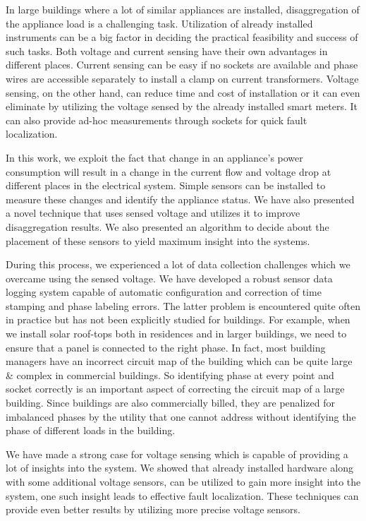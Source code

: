In large buildings where a lot of similar appliances are installed, disaggregation of the appliance load is a challenging task. Utilization of already installed instruments can be a big factor in deciding the practical feasibility and success of such tasks.
Both voltage and current sensing have their own advantages in different places. Current sensing can be easy if no sockets are available and phase wires are accessible separately to install a clamp on current transformers. Voltage sensing, on the other hand, can reduce time and cost of installation or it can even eliminate by utilizing the voltage sensed by the already installed smart meters. It can also provide ad-hoc measurements through sockets for quick fault localization.

In this work, we exploit the fact that change in an appliance's power consumption will result in a change in the current flow and voltage drop at different places in the electrical system. Simple sensors can be installed to measure these changes and identify the appliance status. We have also presented a novel technique that uses sensed voltage and utilizes it to improve disaggregation results. We also presented an algorithm to decide about the placement of these sensors to yield maximum insight into the systems.

During this process, we experienced a lot of data collection challenges which we overcame using the sensed voltage. We have developed a robust sensor data logging system capable of automatic configuration and correction of time stamping and phase labeling errors.  The latter problem is encountered quite often in practice but has not been explicitly studied for buildings.  For example,  when we install solar roof-tops both in residences and in larger buildings, we need to ensure that a panel is connected to the right phase. In fact, most building managers have an incorrect circuit map of the building which can be quite large \& complex in commercial buildings. So identifying phase at every point and socket correctly is an important aspect of correcting the circuit map of a large building. Since buildings are also commercially billed, they are penalized for imbalanced phases by the utility that one cannot address without identifying the phase of different loads in the building.

We have made a strong case for voltage sensing which is capable of providing a lot of insights into the system. We showed that already installed hardware along with some additional voltage sensors, can be utilized to gain more insight into the system, one such insight leads to effective fault localization. These techniques can provide even better results by utilizing more precise voltage sensors.
